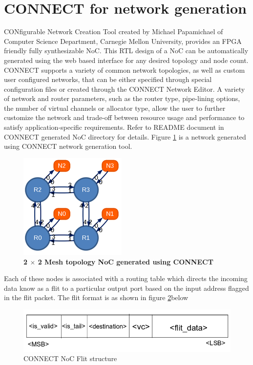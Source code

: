 \section{CONNECT for network generation}
\hspace{5mm}CONfigurable Network Creation Tool \cite{connect_NoC_tool} created by Michael Papamichael of Computer Science Department, Carnegie Mellon University, provides an FPGA friendly fully synthesizable NoC. This RTL design of a NoC can be automatically generated using the web based interface for any desired topology and node count. CONNECT supports a variety of common network topologies, as well as custom user configured networks, that can be either specified through special configuration files or created through the CONNECT Network Editor. A variety of network and router parameters, such as the router type, pipe-lining options, the number of virtual channels or allocator type, allow the user to further customize the network and trade-off between resource usage and performance to satisfy application-specific requirements. Refer to README document in CONNECT generated NoC directory for details. Figure \ref{connectMeshFig} is a network generated using CONNECT network generation tool.
\begin{figure}[H]
	\centering
	\includegraphics[scale=1]{./figs/connectMeshFig}
	\caption{\textbf{2 $\times$ 2 Mesh topology NoC generated using CONNECT}}
	\label{connectMeshFig}
\end{figure}

\hspace{5mm}Each of these nodes is associated with a routing table which directs the incoming data know as a flit to a particular output port based on the input address flagged in the flit packet. The flit format is as shown in figure \ref{flit_structure}below

\begin{figure}[H]
\centering
\includegraphics[scale=0.5]{./figs/flit_structure}
\caption{CONNECT NoC Flit structure}
\label{flit_structure}
\end{figure}

